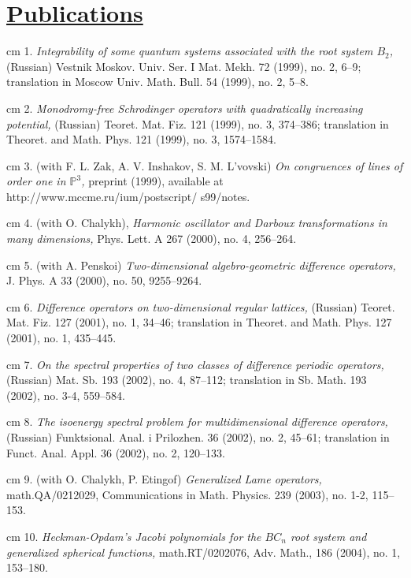 \documentclass[11pt]{amsart}
\theoremstyle{plain}
\theoremstyle{definition}
\theoremstyle{remark}
\begin{document}
\clearpage


\section*{\Large\underline{Publications}}

\noindent{} cm 1.  {\it Integrability of some quantum
systems associated with the root system $B_2$,} (Russian) Vestnik
Moskov. Univ. Ser. I Mat. Mekh.  72 (1999), no. 2, 6--9;
        translation in Moscow Univ. Math. Bull. 54 (1999), no. 2, 5--8.

\noindent{} cm 2. {\it Monodromy-free Schrodinger
operators with quadratically increasing potential,} (Russian)
Teoret. Mat. Fiz. 121 (1999), no. 3, 374--386; translation in
Theoret. and Math. Phys. 121 (1999), no. 3, 1574--1584.

\noindent{} cm 3. (with F. L. Zak, A. V. Inshakov, S.
M. L'vovski) {\it On congruences of lines of order one in
$\mathbb{P}^3$,} preprint (1999), available at
http://www.mccme.ru/ium/postscript/ s99/notes.

\noindent{} cm 4. (with O.  Chalykh), {\it Harmonic
oscillator and Darboux transformations in many dimensions,} Phys.
Lett. A 267 (2000), no. 4, 256--264.

\noindent{} cm 5. (with  A.  Penskoi) {\it
Two-dimensional algebro-geometric difference operators,} J. Phys.
A 33 (2000), no. 50, 9255--9264.

\noindent{} cm 6. {\it Difference operators on
two-dimensional regular lattices,} (Russian) Teoret. Mat. Fiz. 127
(2001), no. 1, 34--46; translation in Theoret. and Math. Phys. 127
(2001), no. 1, 435--445.

\noindent{} cm 7. {\it On the spectral properties of
two classes of difference periodic operators,} (Russian) Mat. Sb.
193 (2002), no. 4, 87--112; translation in  Sb. Math.  193 (2002),
no. 3-4, 559--584.

\noindent{} cm 8. {\it The isoenergy spectral problem
for multidimensional difference operators,} (Russian) Funktsional.
Anal. i Prilozhen. 36 (2002), no. 2, 45--61;  translation in
Funct. Anal. Appl.  36  (2002),  no. 2, 120--133.

\noindent{} cm 9. (with O. Chalykh,   P. Etingof)
{\it  Generalized Lame operators,} math.QA/0212029, Communications
in Math. Physics. 239 (2003), no. 1-2, 115--153.

\noindent{} cm 10. {\it Heckman-Opdam's Jacobi
       polynomials for the $BC_n$ root system and
        generalized spherical functions,} math.RT/0202076,
        Adv. Math.,  186  (2004),  no. 1, 153--180.
\end{document}
